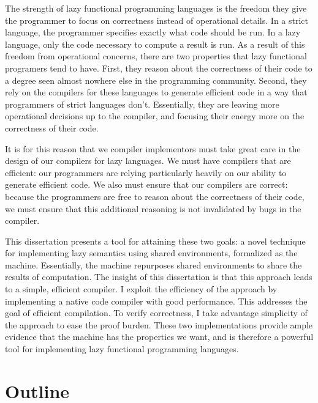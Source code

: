 The strength of lazy functional programming languages is the freedom they
give the programmer to focus on correctness instead of operational details. In a
strict language, the programmer specifies exactly what code should be run. In a
lazy language, only the code necessary to compute a result is run. As a result
of this freedom from operational concerns, there are two properties that lazy
functional programers tend to have. First, they reason about the correctness of
their code to a degree seen almost nowhere else in the programming community.
Second, they rely on the compilers for these languages to generate efficient
code in a way that programmers of strict languages don't.  Essentially, they are
leaving more operational decisions up to the compiler, and focusing their energy
more on the correctness of their code. 

It is for this reason that we compiler implementors must take great care in the
design of our compilers for lazy languages. We must have compilers that are
efficient: our programmers are relying particularly heavily on our ability to
generate efficient code. We also must ensure that our compilers are correct:
because the programmers are free to reason about the correctness of their code,
we must ensure that this additional reasoning is not invalidated by bugs in the
compiler. 

This dissertation presents a tool for attaining these two goals: a novel
technique for implementing lazy semantics using shared environments, formalized
as the \ce machine. Essentially, the \ce machine repurposes shared environments
to share the results of computation. The insight of this dissertation is that
this approach leads to a simple, efficient compiler. I exploit the efficiency of
the approach by implementing a native code compiler with good performance. This
addresses the goal of efficient compilation. To verify correctness, I take
advantage simplicity of the approach to ease the proof burden. These two
implementations provide ample evidence that the \ce machine has the properties
we want, and is therefore a powerful tool for implementing lazy functional
programming languages.

\section{Outline}


